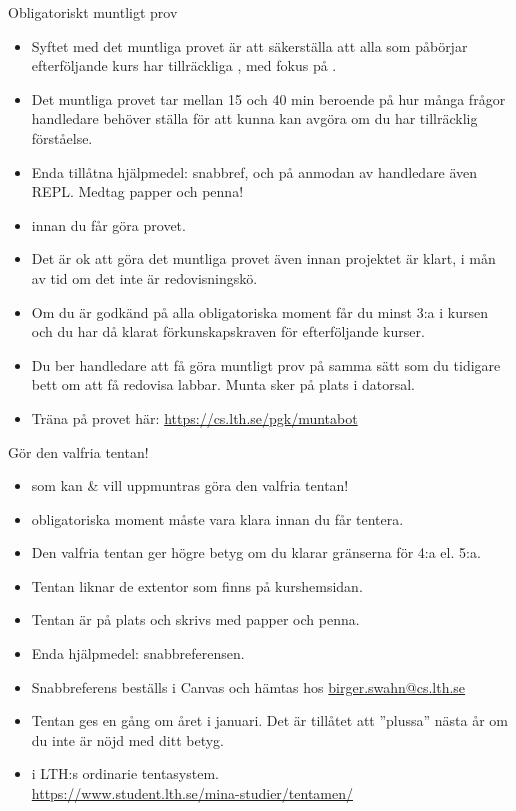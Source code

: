 \begin{SlideExtra}{Obligatoriskt muntligt prov}
\begin{itemize}\SlideFontSmall
  \item Syftet med det muntliga provet är att säkerställa att alla som påbörjar efterföljande kurs har tillräckliga , med fokus på .
  \item Det muntliga provet tar mellan 15 och 40 min beroende på hur många frågor handledare behöver ställa för att kunna kan avgöra om du har tillräcklig förståelse.
  \item Enda tillåtna hjälpmedel: snabbref, och på anmodan av handledare även REPL. Medtag papper och penna!
  \item {} innan du får göra  provet.
  \item Det är ok att göra det muntliga provet även innan projektet är klart, i mån av tid om  det inte är redovisningskö.
  \item Om du är godkänd på alla obligatoriska moment får du minst 3:a i kursen och du har då klarat förkunskapskraven för efterföljande kurser.
  \item Du ber handledare att få göra muntligt prov på samma sätt som du tidigare bett om att få redovisa labbar. Munta sker på plats i datorsal.
  \item Träna på provet här: \url{https://cs.lth.se/pgk/muntabot}
\end{itemize}  
\end{SlideExtra}

\begin{SlideExtra}{Gör den valfria tentan!}
\begin{itemize}\SlideFontSmall
  \item {} som kan \& vill uppmuntras göra den valfria tentan!
  \item {} obligatoriska moment måste vara klara innan du får tentera.
  \item Den valfria tentan ger högre betyg om du klarar gränserna för 4:a el. 5:a.
  \item Tentan liknar de extentor som finns på kurshemsidan.
  \item Tentan är på plats och skrivs med papper och penna. 
  \item Enda hjälpmedel: snabbreferensen.
  \item Snabbreferens beställs i Canvas och hämtas hos \url{birger.swahn@cs.lth.se}
  \item Tentan ges en gång om året i januari. Det är tillåtet att ''plussa'' nästa år om du inte är nöjd med ditt betyg.
  \item {} i LTH:s ordinarie tentasystem. \\ %
  \url{https://www.student.lth.se/mina-studier/tentamen/} 
\end{itemize}
\end{SlideExtra}



